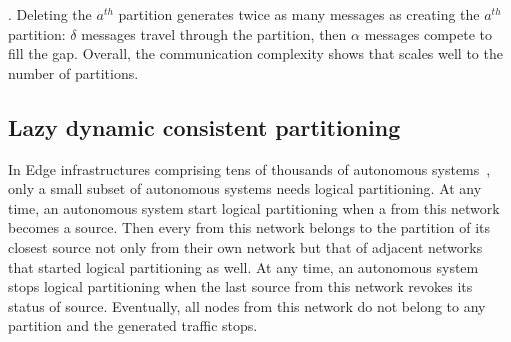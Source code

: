 .
Deleting the $a^{th}$ partition generates twice as many messages as
creating the $a^{th}$ partition: $\delta$ messages travel through the
partition, then $\alpha$ messages compete to fill the gap.  Overall,
the communication complexity shows that \NAME scales well to the
number of partitions.





\subsection{Lazy dynamic consistent partitioning}
\label{subsec:lazy}

In Edge infrastructures comprising tens of thousands of autonomous
systems~\cite{nur2018crossas}, only a small subset of autonomous
systems needs logical partitioning. At any time, an autonomous system
start logical partitioning when a \process from this network becomes a
source.  Then every \process from this network belongs to the
partition of its closest source not only from their own network but
that of adjacent networks that started logical partitioning as well.
At any time, an autonomous system stops logical partitioning when the
last source from this network revokes its status of
source. Eventually, all nodes from this network do not belong to any
partition and the generated traffic stops.

